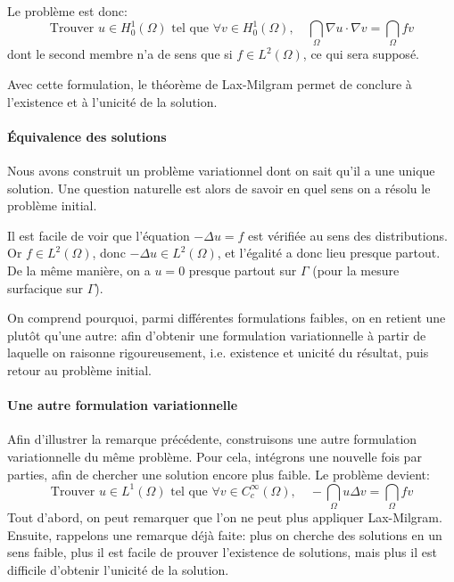 Le problème est donc:
\begin{equation}
\text{Trouver }u\in H^1_0(\Omega) \text{ tel que }
\forall v\in H^1_0(\Omega),\quad
\dint_\Omega \nabla u\cdot\nabla v  =  \dint_\Omega fv
\end{equation}
dont le second membre n'a de sens que si $f\in L^2(\Omega)$, ce qui
sera supposé.

Avec cette formulation, le théorème de Lax-Milgram permet de conclure
à l'existence et à l'unicité de la solution.

\medskip{}
\paragraph{Équivalence des solutions}
Nous avons construit un problème variationnel dont on sait qu'il a une
unique solution.
Une question naturelle est alors de savoir en quel sens on a résolu le problème initial.

Il est facile de voir que l'équation $-\Delta u = f$ est vérifiée au sens des distributions.
Or $f\in L^2(\Omega)$, donc $-\Delta u \in L^2(\Omega)$, et l'égalité a donc lieu presque
partout.
De la même manière, on a $u = 0$ presque partout sur $\Gamma$ (pour la mesure
surfacique sur $\Gamma$).

On comprend pourquoi, parmi différentes formulations faibles, on en retient une
plutôt qu'une autre: afin d'obtenir une formulation variationnelle à partir de laquelle
on raisonne rigoureusement, i.e. existence et unicité du résultat, puis retour au problème
initial.

\medskip{}
\paragraph{Une autre formulation variationnelle}
Afin d'illustrer la remarque précédente, construisons une autre formulation
variationnelle du même problème.
Pour cela, intégrons une nouvelle fois par parties, afin de chercher
une solution encore plus faible.
Le problème devient:
\begin{equation}
\text{Trouver }u\in L^1(\Omega) \text{ tel que }
\forall v\in C_c^\infty(\Omega),\quad
-\dint_\Omega u\Delta v  =  \dint_\Omega fv
\end{equation}
Tout d'abord, on peut remarquer que l'on ne peut plus appliquer Lax-Milgram.
Ensuite, rappelons une remarque déjà faite:
plus on cherche des solutions en un sens faible, plus il est facile de prouver l'existence
de solutions, mais plus il est difficile d'obtenir l'unicité de la solution.

